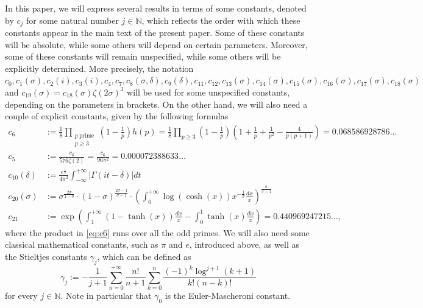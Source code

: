 \documentclass[10pt,a4paper]{amsart}
\theoremstyle{plain}
\theoremstyle{definition}
\theoremstyle{remark}
\begin{document}
In this paper, we will express several results in terms of some constants, denoted by $c_j$ for some natural number $j \in \mathbb{N}$, which reflects the order with which these constants appear in the main text of the present paper. Some of these constants will be absolute, while some others will depend on certain parameters. Moreover, some of these constants will remain unspecified, while some others will be explicitly determined. More precisely, the notation $c_0,c_1(\sigma),c_2(i),c_3(i),c_4,c_7,c_8(\sigma,\delta),c_9(\delta),c_{11},c_{12},c_{13}(\sigma),c_{14}(\sigma),c_{15}(\sigma),c_{16}(\sigma),c_{17}(\sigma),c_{18}(\sigma)$ and $c_{19}(\sigma) = c_{18}(\sigma) \zeta(2 \sigma)^3$ will be used for some unspecified constants, depending on the parameters in brackets. On the other hand, we will also need a couple of explicit constants, given by the following formulas
\begin{align}
    \label{eq:c6}
    c_6 &:= \frac{1}{8}\prod_{\substack{p \ \text{prime}\\p\geq 3}}\left(1-\frac{1}{p}\right)h(p) = \frac{1}{8}\prod_{p\geq 3}\left(1-\frac{1}{p}\right) \left( 1+\frac{1}{p}+\frac{1}{p^2}-\frac{4}{p(p+1)} \right) = 0.068586928786\dots \\
    \label{eq:c5}
    c_5 &:= \frac{c_6}{576 \zeta(2)} = \frac{c_6}{96 \pi^2} = 0.000072388633\dots \\
    \label{eq:c10} c_{10}(\delta) &:= \frac{e^{\frac{1}{2}}}{4 \pi^2} \int_{-\infty}^{+\infty} \lvert \Gamma(it-\delta) \rvert dt \\
\label{eq:c20}
c_{20}(\sigma) &:= \sigma^{\frac{2 \sigma}{1-\sigma}} \cdot (1-\sigma)^{\frac{2\sigma-1}{\sigma-1}} \cdot \left(\int_0^{+\infty} \log(\cosh(x)) x^{-\frac{1}{\sigma}} \frac{dx}{x} \right)^{\frac{\sigma}{\sigma-1}} \\
\label{eq:21}
c_{21} &:= \exp\left(\int_1^{+\infty} (1-\tanh(x)) \frac{dx}{x} - \int_0^1 \tanh(x) \frac{dx}{x}\right) = 0.440969247215\dots,
\end{align}
where the product in \eqref{eq:c6} runs over all the odd primes.
We will also need some classical mathematical constants, such as $\pi$ and $e$, introduced above, as well as the Stieltjes constants $\gamma_j$, which can be defined as 
\begin{equation} \label{eq:Stieltjes}
    \gamma_j := -\frac{1}{j+1} \sum_{n=0}^{+\infty} \frac{n!}{n+1} \sum_{k=0}^n \frac{(-1)^k \log^{j+1}(k+1)}{k! (n-k)!}
\end{equation}
for every $j \in \mathbb{N}$. Note in particular that $\gamma_0$ is the Euler-Mascheroni constant.
\end{document}
